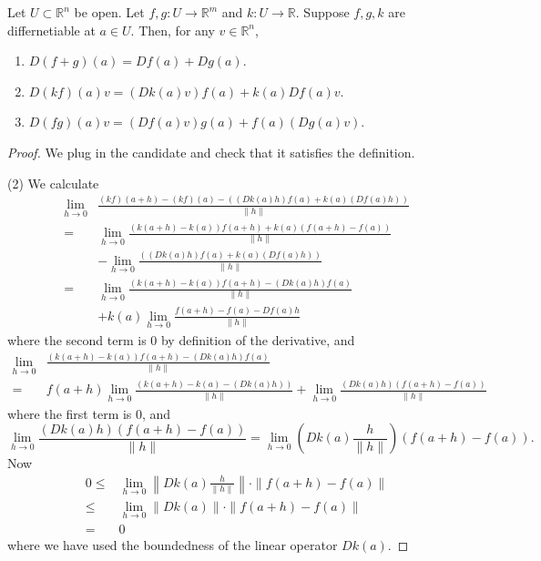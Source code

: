 \documentclass[12pt]{article}
\begin{document}
\begin{proposition}
	Let $U\subset\mathbb{R}^n$ be open. Let $f,g:U\to\mathbb{R}^m$ and $k:U\to\mathbb{R}$. Suppose $f,g,k$ are differnetiable at $a\in U$. Then, for any $v\in\mathbb{R}^n$,
	\begin{enumerate}
		\item $D(f+g)(a) = Df(a)+Dg(a)$.
		\item $D(kf)(a)v = (Dk(a)v)f(a) + k(a)Df(a)v$.
		\item $D(fg)(a)v = (Df(a)v)g(a) + f(a)(Dg(a)v)$.
	\end{enumerate}
\end{proposition}
\begin{proof}
	We plug in the candidate and check that it satisfies the definition.

	(2) We calculate
	\begin{align*}
		\lim_{h\to 0}& \frac{(kf)(a+h)-(kf)(a)- ((Dk(a)h)f(a)+k(a)(Df(a)h))}{\|h\|} \\
		=& \lim_{h\to 0}\frac{(k(a+h)-k(a))f(a+h) + k(a)(f(a+h)-f(a))}{\|h\|} \\ \quad& -\lim_{h\to 0} \frac{((Dk(a)h)f(a)+k(a)(Df(a)h))}{\|h\|} \\
		=& \lim_{h\to 0}\frac{(k(a+h)-k(a))f(a+h)-(Dk(a)h)f(a)}{\|h\|} \\ \quad& + k(a)\lim_{h\to 0}\frac{f(a+h)-f(a)-Df(a)h}{\|h\|}
	\end{align*}
	where the second term is 0 by definition of the derivative, and 
	\begin{align*}
		\lim_{h\to 0}& \frac{(k(a+h)-k(a))f(a+h)-(Dk(a)h)f(a)}{\|h\|} \\
		=& f(a+h)\lim_{h\to 0}\frac{(k(a+h)-k(a)-(Dk(a)h))}{\|h\|} + \lim_{h\to 0}\frac{(Dk(a)h)(f(a+h)-f(a))}{\|h\|}
	\end{align*}
	where the first term is 0, and 
	\begin{equation*}
		\lim_{h\to 0}\frac{(Dk(a)h)(f(a+h)-f(a))}{\|h\|} = \lim_{h\to 0}\left( Dk(a)\frac{h}{\|h\|} \right)(f(a+h)-f(a)).
	\end{equation*}
	Now 
	\begin{align*}
		0 \leq& \lim_{h\to 0}\left\| Dk(a)\frac{h}{\|h\|} \right\|\cdot \|f(a+h)-f(a)\| \\
		\leq& \lim_{h\to 0}\|Dk(a)\|\cdot \|f(a+h) - f(a)\| \\
		=& 0
	\end{align*}
	where we have used the boundedness of the linear operator $Dk(a)$.
\end{proof}
\end{document}
